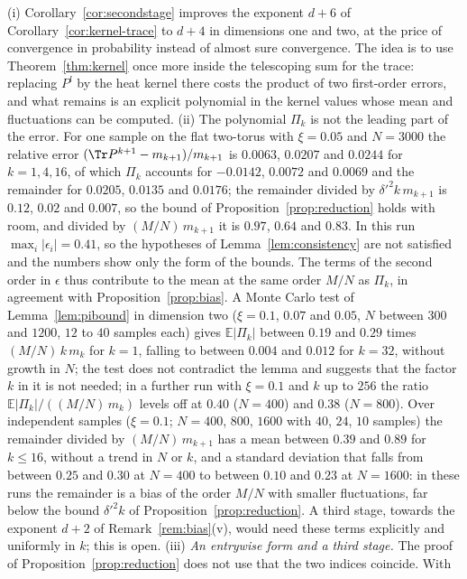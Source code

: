 \begin{remark}\label{rem:secondstage}
(i) Corollary~\ref{cor:secondstage} improves the exponent $d+6$ of Corollary~\ref{cor:kernel-trace} to $d+4$ in dimensions one and two, at the price of convergence in probability instead of almost sure convergence. The idea is to use Theorem~\ref{thm:kernel} once more inside the telescoping sum for the trace: replacing $P^l$ by the heat kernel there costs the product of two first-order errors, and what remains is an explicit polynomial in the kernel values whose mean and fluctuations can be computed. (ii) The polynomial $\Pi_k$ is not the leading part of the error. For one sample on the flat two-torus with $\xi=0.05$ and $N=3000$ the relative error $(\Tr P^{k+1}-m_{k+1})/m_{k+1}$ is $0.0063$, $0.0207$ and $0.0244$ for $k=1,4,16$, of which $\Pi_k$ accounts for $-0.0142$, $0.0072$ and $0.0069$ and the remainder for $0.0205$, $0.0135$ and $0.0176$; the remainder divided by $\delta'^2k\,m_{k+1}$ is $0.12$, $0.02$ and $0.007$, so the bound of Proposition~\ref{prop:reduction} holds with room, and divided by $(M/N)\,m_{k+1}$ it is $0.97$, $0.64$ and $0.83$. In this run $\max_i|\epsilon_i|=0.41$, so the hypotheses of Lemma~\ref{lem:consistency} are not satisfied and the numbers show only the form of the bounds. The terms of the second order in $\epsilon$ thus contribute to the mean at the same order $M/N$ as $\Pi_k$, in agreement with Proposition~\ref{prop:bias}. A Monte Carlo test of Lemma~\ref{lem:pibound} in dimension two ($\xi=0.1$, $0.07$ and $0.05$, $N$ between $300$ and $1200$, $12$ to $40$ samples each) gives $\mathbb E|\Pi_k|$ between $0.19$ and $0.29$ times $(M/N)\,k\,m_k$ for $k=1$, falling to between $0.004$ and $0.012$ for $k=32$, without growth in $N$; the test does not contradict the lemma and suggests that the factor $k$ in it is not needed; in a further run with $\xi=0.1$ and $k$ up to $256$ the ratio $\mathbb E|\Pi_k|/((M/N)\,m_k)$ levels off at $0.40$ ($N=400$) and $0.38$ ($N=800$). Over independent samples ($\xi=0.1$; $N=400$, $800$, $1600$ with $40$, $24$, $10$ samples) the remainder divided by $(M/N)\,m_{k+1}$ has a mean between $0.39$ and $0.89$ for $k\le16$, without a trend in $N$ or $k$, and a standard deviation that falls from between $0.25$ and $0.30$ at $N=400$ to between $0.10$ and $0.23$ at $N=1600$: in these runs the remainder is a bias of the order $M/N$ with smaller fluctuations, far below the bound $\delta'^2k$ of Proposition~\ref{prop:reduction}. A third stage, towards the exponent $d+2$ of Remark~\ref{rem:bias}(v), would need these terms explicitly and uniformly in $k$; this is open. (iii) \emph{An entrywise form and a third stage.} The proof of Proposition~\ref{prop:reduction} does not use that the two indices coincide. With

\end{remark}
